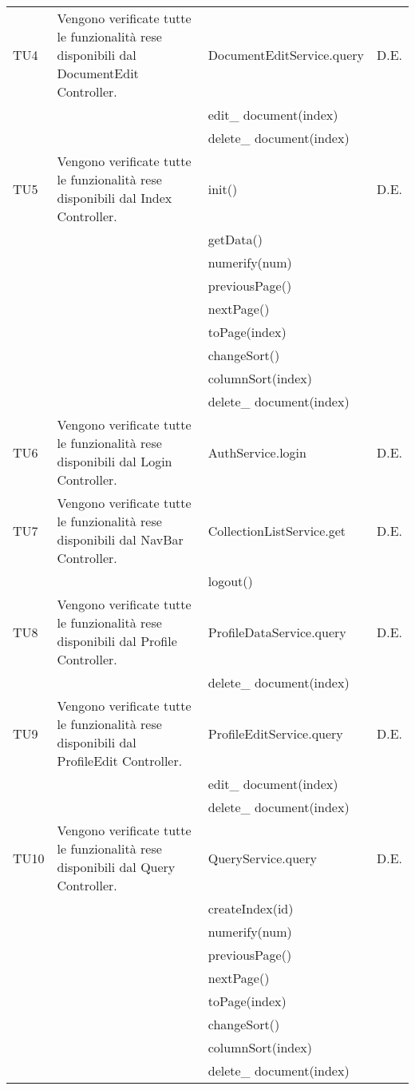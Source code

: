\begin{center}
\begin{longtable}{|p{1cm}|p{4cm}|p{6cm}|p{2cm}|}
\midrule
TU4
& Vengono verificate tutte le funzionalità rese disponibili dal DocumentEdit Controller.
& DocumentEditService.query
& D.E.\\
& & edit\_ document(index) &\\
& & delete\_ document(index) &\\



\midrule
TU5
& Vengono verificate tutte le funzionalità rese disponibili dal Index Controller.
&  init() & D.E.\\
& & getData()& \\
& &  numerify(num)& \\
& &  previousPage()& \\
& &  nextPage()& \\
& &  toPage(index)& \\
& &  changeSort()& \\
& &  columnSort(index)& \\
& &  delete\_ document(index)& \\




\midrule
TU6
& Vengono verificate tutte le funzionalità rese disponibili dal Login Controller.
& AuthService.login
& D.E.\\


\midrule
TU7
& Vengono verificate tutte le funzionalità rese disponibili dal NavBar Controller.
& CollectionListService.get
& D.E.\\
& & logout() &\\



\midrule
TU8
& Vengono verificate tutte le funzionalità rese disponibili dal Profile Controller.
& ProfileDataService.query
& D.E.\\
& & delete\_ document(index) &\\


\midrule
TU9
& Vengono verificate tutte le funzionalità rese disponibili dal ProfileEdit Controller.
& ProfileEditService.query
& D.E.\\

& & edit\_ document(index) &\\
& & delete\_ document(index) &\\


\midrule
TU10
& Vengono verificate tutte le funzionalità rese disponibili dal Query Controller.
& QueryService.query
& D.E.\\
& & createIndex(id) &\\
& & numerify(num) &\\
& & previousPage() &\\
& & nextPage() &\\
& & toPage(index) &\\
& & changeSort() &\\
& & columnSort(index) &\\
& & delete\_ document(index) &\\




\end{longtable}
\end{center}
